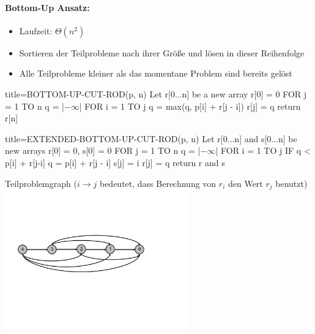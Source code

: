 \documentclass[
    ngerman,
    color=3b,
    dark_mode,
    load_common, %
    summary,
    boxarc,
]{tuda_summary}
\begin{document}
\paragraph{Bottom-Up Ansatz:}
\begin{itemize}
    \item Laufzeit: $\Theta(n^2)$
    \item Sortieren der Teilprobleme nach ihrer Grö\ss e und lösen in dieser Reihenfolge
    \item Alle Teilprobleme kleiner als das momentane Problem sind bereits gelöst
\end{itemize}
\begin{minipage}[t]{.46\textwidth}\mbox{}
    \begin{codeBlock}[autogobble,escapeinside=||]{title={BOTTOM-UP-CUT-ROD(p, n)}}
        Let r[0...n] be a new array
        r[0] = 0
        FOR j = 1 TO n
            q = |$-\infty$|
            FOR i = 1 TO j
                q = max(q, p[i] + r[j - i])
            r[j] = q
        return r[n]
    \end{codeBlock}
\end{minipage}
\begin{minipage}[t]{.54\textwidth-2.22166pt}\mbox{}
    \begin{codeBlock}[autogobble,escapeinside=||]{title={EXTENDED-BOTTOM-UP-CUT-ROD(p, n)}}
        Let r[0...n] and s[0...n] be  new arrays
        r[0] = 0, s[0] = 0
        FOR j = 1 TO n
            q = |$-\infty$|
            FOR i = 1 TO j
                IF q < p[i] + r[j-i]
                    q = p[i] + r[j - i]
                    s[j] = i
            r[j] = q
        return r and s
    \end{codeBlock}
\end{minipage}

Teilproblemgraph ($i \rightarrow j$ bedeutet, dass Berechnung von $r_i$ den Wert $r_j$ benutzt)\\
\includegraphics[width=8cm]{pictures/teilproblemgraph.pdf}
\end{document}
